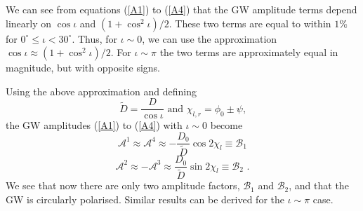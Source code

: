 \documentclass[11pt]{cuthesis}
\newcommand{\fs}{\text{ .}}
\begin{document}
We can see from equations (\ref{A1}) to (\ref{A4}) that the GW amplitude terms depend linearly on $\cos\iota$ and $(1+\cos^2\iota)/2$. These two terms are equal to within $1\%$ for $0^\circ\leq\iota<30^\circ$. Thus, for $\iota \sim 0$, we can use the approximation $\cos\iota \approx (1+\cos^2\iota)/2$. For $\iota \sim \pi$ the two terms are approximately equal in magnitude, but with opposite signs. 

Using the above approximation and defining 
\begin{equation}
\tilde{D} = \frac{D}{\cos\iota} \text{   and   } \chi_{l,r} = \phi_0 \pm \psi \text{,} 
\end{equation}
the GW amplitudes  (\ref{A1}) to (\ref{A4}) with $\iota\sim 0$ become
\begin{equation}
\mathcal{A}^1 \approx \mathcal{A}^4 \approx -\frac{D_0}{\tilde{D}} \cos 2\chi_l \equiv \mathcal{B}_1
\end{equation}
\begin{equation}
\mathcal{A}^2 \approx -\mathcal{A}^3 \approx \frac{D_0}{\tilde{D}} \sin 2\chi_l \equiv \mathcal{B}_2 \fs
\end{equation}
We see that now there are only two amplitude factors, $\mathcal{B}_1$ and $\mathcal{B}_2$, and that the GW is circularly polarised. Similar results can be derived for the $\iota \sim \pi$ case. 
\end{document}

